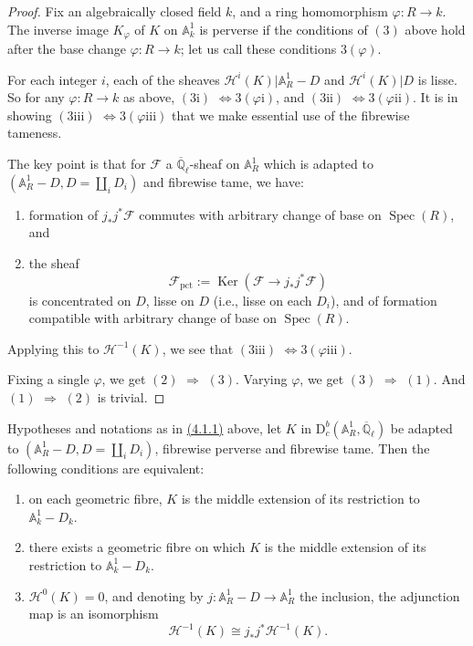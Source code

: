 \begin{proof}
Fix an algebraically closed field \(k\), and a ring homomorphism
\(\varphi:R\to k\). The inverse image \(K_\varphi\) of \(K\) on
\(\mathbb{A}^1_k\) is perverse if the conditions of \((3)\) above hold after the
base change \(\varphi:R\to k\); let us call these conditions \(3(\varphi)\).

For each integer \(i\), each of the sheaves
\(\mathcal{H}^i(K)\vert\mathbb{A}^1_R-D\) and
\(\mathcal{H}^i(K)\vert D\) is lisse. So for any \(\varphi:R\to k\) as above,
\((3\mathrm{i})\) \(\Leftrightarrow 3(\varphi\mathrm{i})\), and
\((3\mathrm{ii})\) \(\Leftrightarrow 3(\varphi\mathrm{ii})\). It is in showing
\((3\mathrm{iii})\) \(\Leftrightarrow 3(\varphi\mathrm{iii})\) that we make essential use
of the fibrewise tameness.

The key point \cite[4.7.2 and 4.7.3]{Ka-SE} is that for \(\mathcal{F}\) a
\(\overline{\mathbb{Q}}_\ell\)-sheaf on \(\mathbb{A}^1_R\) which is adapted to
\((\mathbb{A}^1_R-D,D=\coprod_iD_i)\) and fibrewise tame, we have:
\begin{enumerate}[label=(\arabic*)]
\item formation of \(j_*j^*\mathcal{F}\) commutes with arbitrary change of base
on \(\operatorname{Spec}(R)\), and
\item the sheaf
\[
  \mathcal{F}_{\mathrm{pct}}:=\operatorname{Ker}(\mathcal{F}\to j_*j^*\mathcal{F})
\]
is concentrated on \(D\), lisse on \(D\) (i.e., lisse on each \(D_i\)), and of
formation compatible with arbitrary change of base on \(\operatorname{Spec}(R)\).
\end{enumerate}
Applying this to \(\mathcal{H}^{-1}(K)\), we see that
\((3\mathrm{iii})\) \(\Leftrightarrow 3(\varphi\mathrm{iii})\).

Fixing a single \(\varphi\), we get \((2)\) \(\Rightarrow\) \((3)\). Varying
\(\varphi\), we get \((3)\) \(\Rightarrow\) \((1)\). And \((1)\) \(\Rightarrow\) \((2)\) is
trivial.
\end{proof}

Hypotheses and notations as in \hyperref[par:4.1.1]{(4.1.1)} above, let \(K\)
in \(\mathrm{D}^b_c(\mathbb{A}^1_R,\overline{\mathbb{Q}}_\ell)\) be adapted to
\((\mathbb{A}^1_R-D,D=\coprod_iD_i)\), fibrewise perverse and fibrewise tame.
Then the following conditions are equivalent:
\begin{enumerate}[label=(\arabic*)]
\item on each geometric fibre, \(K\) is the middle extension of its restriction
to \(\mathbb{A}^1_k-D_k\).
\item there exists a geometric fibre on which \(K\) is the middle extension of
its restriction to \(\mathbb{A}^1_k-D_k\).
\item \(\mathcal{H}^0(K)=0\), and denoting by
\(j:\mathbb{A}^1_R-D\to\mathbb{A}^1_R\) the inclusion, the adjunction map is an
isomorphism
\[
  \mathcal{H}^{-1}(K)\cong j_*j^*\mathcal{H}^{-1}(K).
\]
\end{enumerate}

